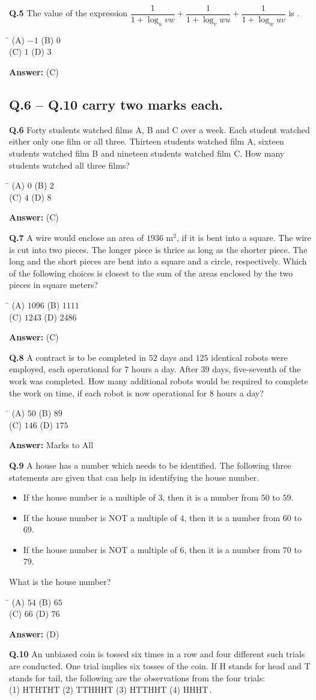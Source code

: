 \documentclass[11pt,a4paper]{article}
\newcommand{\optsfourA}[4]{%
  \begin{tabbing}
    \hspace{0.48\linewidth}\=\kill
    (A) #1 \> (B) #2 \\[2pt]
    (C) #3 \> (D) #4
  \end{tabbing}%
}
\newcommand{\ans}[1]{\textbf{Answer:} #1\par\medskip}
\begin{document}
\textbf{Q.5} The value of the expression $\dfrac{1}{1 + \log_u vw} + \dfrac{1}{1 + \log_v wu} + \dfrac{1}{1 + \log_w uv}$ is \underline{\hspace{2cm}}.
\optsfourA{$-1$}{$0$}{$1$}{$3$}
\ans{(C)}

\subsection*{Q.6 -- Q.10 carry two marks each.}

\textbf{Q.6} Forty students watched films A, B and C over a week. Each student watched either only one film or all three. Thirteen students watched film A, sixteen students watched film B and nineteen students watched film C. How many students watched all three films?
\optsfourA{$0$}{$2$}{$4$}{$8$}
\ans{(C)}

\textbf{Q.7} A wire would enclose an area of $1936\text{ m}^2$, if it is bent into a square. The wire is cut into two pieces. The longer piece is thrice as long as the shorter piece. The long and the short pieces are bent into a square and a circle, respectively. Which of the following choices is closest to the sum of the areas enclosed by the two pieces in square meters?
\optsfourA{$1096$}{$1111$}{$1243$}{$2486$}
\ans{(C)}

\textbf{Q.8} A contract is to be completed in $52$ days and $125$ identical robots were employed, each operational for $7$ hours a day. After $39$ days, five-seventh of the work was completed. How many additional robots would be required to complete the work on time, if each robot is now operational for $8$ hours a day?
\optsfourA{$50$}{$89$}{$146$}{$175$}
\ans{Marks to All}

\textbf{Q.9} A house has a number which needs to be identified. The following three statements are given that can help in identifying the house number.
\begin{itemize}
  \setlength{\itemsep}{1pt}\setlength{\parskip}{0pt}
  \item[i.] If the house number is a multiple of $3$, then it is a number from $50$ to $59$.
  \item[ii.] If the house number is NOT a multiple of $4$, then it is a number from $60$ to $69$.
  \item[iii.] If the house number is NOT a multiple of $6$, then it is a number from $70$ to $79$.
\end{itemize}
What is the house number?
\optsfourA{$54$}{$65$}{$66$}{$76$}
\ans{(D)}

\textbf{Q.10} An unbiased coin is tossed six times in a row and four different such trials are conducted. One trial implies six tosses of the coin. If H stands for head and T stands for tail, the following are the observations from the four trials:\\
(1) HTHTHT \quad (2) TTHHHT \quad (3) HTTHHT \quad (4) HHHT\underline{\hspace{0.6cm}}\,\underline{\hspace{0.6cm}}.
\end{document}
